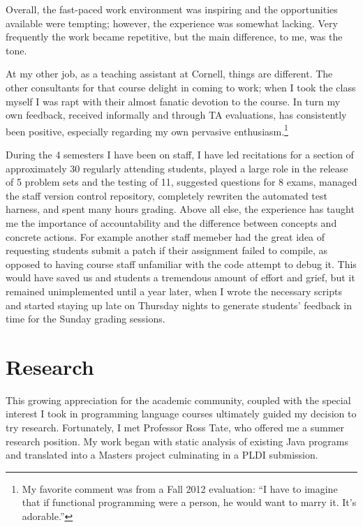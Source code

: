 \documentclass{article}
\begin{document}
Overall, the fast-paced work environment was inspiring and the opportunities available were tempting; however, the experience was somewhat lacking.
Very frequently the work became repetitive, but the main difference, to me, was the tone. 

At my other job, as a teaching assistant at Cornell, things are different.
The other consultants for that course delight in coming to work; when I took the class myself I was rapt with their almost fanatic devotion to the course. 
In turn my own feedback, received informally and through TA evaluations, has consistently been positive, especially regarding my own pervasive enthusiasm.\footnote{My favorite comment was from a Fall 2012 evaluation: ``I have to imagine that if functional programming were a person, he would want to marry it. It's adorable.''}

During the 4 semesters I have been on staff, I have led recitations for a section of approximately 30 regularly attending students, played a large role in the release of 5 problem sets and the testing of 11, suggested questions for 8 exams, managed the staff version control repository, completely rewriten the automated test harness, and spent many hours grading.
Above all else, the experience has taught me the importance of accountability and the difference between concepts and concrete actions.
For example another staff memeber had the great idea of requesting students submit a patch if their assignment failed to compile, as opposed to having course staff unfamiliar with the code attempt to debug it.
This would have saved us and students a tremendous amount of effort and grief, but it remained unimplemented until a year later, when I wrote the necessary scripts and started staying up late on Thursday nights to generate students' feedback in time for the Sunday grading sessions.

\section{Research}
This growing appreciation for the academic community, coupled with the special interest I took in programming language courses ultimately guided my decision to try research.
Fortunately, I met Professor Ross Tate, who offered me a summer research position.
My work began with static analysis of existing Java programs and translated into a Masters project culminating in a PLDI submission.
\end{document}
